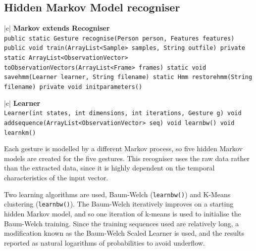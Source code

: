 \documentclass[12pt,a4,notitlepage]{report}
\renewcommand{\_}{\texttt{\symbol{95}}}
\newcommand{\<}{\texttt{\symbol{60}}}
\renewcommand{\>}{\texttt{\symbol{62}}}
\newcommand{\class}[1]{\textbf{#1}}
\newcommand{\variable}[1]{\texttt{#1}}
\begin{document}
\subsection{Hidden Markov Model recogniser}

\begin{tabular}{|c|} \hline 
\class{Markov extends Recogniser} \\ \hline
{}
{ \variable{public static Gesture recognise(Person person, Features features) \newline
public void train(ArrayList<Sample> samples, String out\_file) \newline
private static ArrayList<ObservationVector> toObservationVectors(ArrayList<Frame> frames) \newline
static void save\_hmm(Learner learner, String filename) \newline
static Hmm restore\_hmm(String filename) \newline
private void init\_parameters()
} } \\ \hline
\end{tabular}

\begin{tabular}{|c|} \hline 
\class{Learner} \\ \hline
{}
{ \variable{Learner(int states, int dimensions, int iterations, Gesture g) \newline
void add\_sequence(ArrayList<ObservationVector> seq) \newline
void learnbw() \newline
void learnkm()
} } \\ \hline
\end{tabular}

Each gesture is modelled by a different Markov process, so five hidden Markov models are created for the five gestures. This recogniser uses the raw data rather than the extracted data, since it is highly dependent on the temporal characteristics of the input vector.

Two learning algorithms are used, Baum-Welch (\variable{learnbw()}) and K-Means clustering (\variable{learnbw()}). The Baum-Welch iteratively improves on a starting hidden Markov model, and so one iteration of k-means is used to initialise the Baum-Welch training. Since the training sequences used are relatively long, a modification known as the Baum-Welch Scaled Learner is used, and the results reported as natural logarithms of probabilities to avoid underflow.
\end{document}
